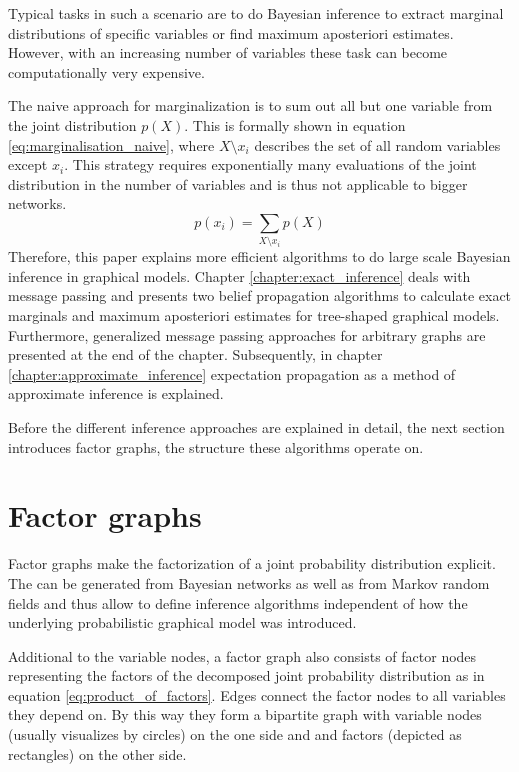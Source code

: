 \documentclass{sigkdd}
\begin{document}
Typical tasks in such a scenario are to do Bayesian inference to extract marginal distributions of specific variables or find maximum aposteriori estimates. However, with an increasing number of variables these task can become computationally very expensive. 

The naive approach for marginalization is to sum out all but one variable from the joint distribution $p(X)$. This is formally shown in equation \ref{eq:marginalisation_naive}, where $X \setminus x_i$ describes the set of all random variables except $x_i$.
This strategy requires exponentially many evaluations of the joint distribution in the number of variables and is thus not applicable to bigger networks.
\begin{equation}\label{eq:marginalisation_naive}
p(x_i)= \sum_{X \setminus x_i} p(X)
\end{equation}
Therefore, this paper explains more efficient algorithms to do large scale Bayesian inference in graphical models. Chapter \ref{chapter:exact_inference} deals with message passing and presents two belief propagation algorithms to calculate exact marginals and maximum aposteriori estimates for tree-shaped graphical models. Furthermore, generalized message passing approaches for arbitrary graphs are presented at the end of the chapter. Subsequently, in chapter \ref{chapter:approximate_inference} expectation propagation as a method of approximate inference is explained.

Before the different inference approaches are explained in detail, the next section introduces factor graphs, the structure these algorithms operate on.

\section{Factor graphs}
Factor graphs make the factorization of a joint probability distribution explicit. The can be generated from Bayesian networks as well as from Markov random fields and thus allow to define inference algorithms independent of how the underlying probabilistic graphical model was introduced.

Additional to the variable nodes, a factor graph also consists of factor nodes representing the factors of the decomposed joint probability distribution as in equation  \ref{eq:product_of_factors}. Edges connect the factor nodes to all variables they depend on. By this way they form a bipartite graph with variable nodes (usually visualizes by circles) on the one side and and factors (depicted as rectangles) on the other side.
\end{document}
